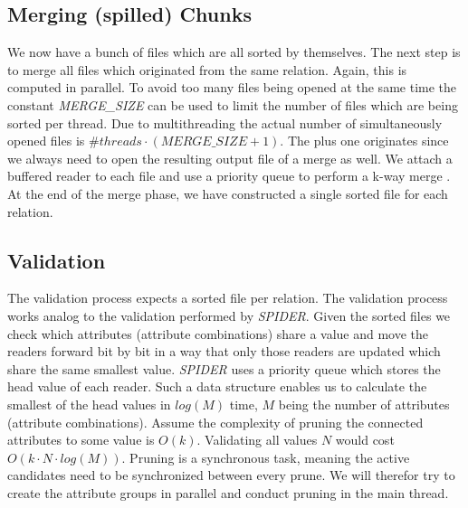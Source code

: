 \subsection{Merging (spilled) Chunks}
We now have a bunch of files which are all sorted by themselves. The next step is to merge all files which originated from the same relation. Again, this is computed in parallel. To avoid too many files being opened at the same time the constant \textit{MERGE\_SIZE} can be used to limit the number of files which are being sorted per thread. Due to multithreading the actual number of simultaneously opened files is $\#threads \cdot (MERGE\_SIZE + 1)$. The plus one originates since we always need to open the resulting output file of a merge as well. We attach a buffered reader to each file and use a priority queue to perform a k-way merge \cite{taniar2008high}. At the end of the merge phase, we have constructed a single sorted file for each relation.

\subsection{Validation}\label{sec:spind_val}
The validation process expects a sorted file per relation. The validation process works analog to the validation performed by \textit{SPIDER}. Given the sorted files we check which attributes (attribute combinations) share a value and move the readers forward bit by bit in a way that only those readers are updated which share the same smallest value. \textit{SPIDER} uses a priority queue which stores the head value of each reader. Such a data structure enables us to calculate the smallest of the head values in $log(M)$ time, $M$ being the number of attributes (attribute combinations). Assume the complexity of pruning the connected attributes to some value is $O(k)$. Validating all values $N$ would cost $O(k \cdot N \cdot log(M))$. Pruning is a synchronous task, meaning the active candidates need to be synchronized between every prune. We will therefor try to create the attribute groups in parallel and conduct pruning in the main thread.

